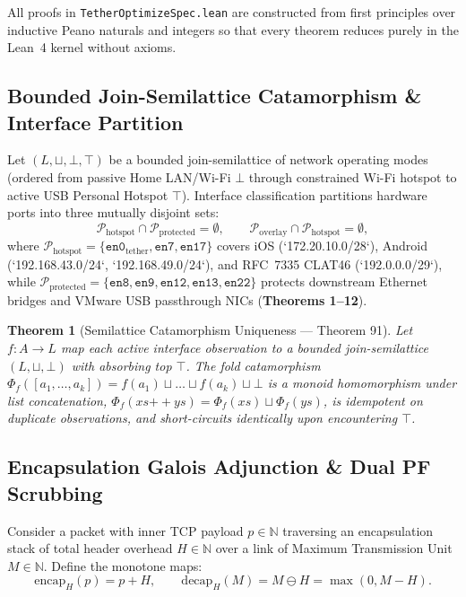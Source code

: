 \documentclass[11pt,a4paper]{article}
\newtheorem{theorem}{Theorem}[section]
\theoremstyle{definition}
\begin{document}
All proofs in \texttt{TetherOptimizeSpec.lean} are constructed from first principles over inductive Peano naturals and integers so that every theorem reduces purely in the Lean~4 kernel without axioms.

\subsection{Bounded Join-Semilattice Catamorphism \& Interface Partition}

Let $(L, \sqcup, \bot, \top)$ be a bounded join-semilattice of network operating modes (ordered from passive Home LAN/Wi-Fi $\bot$ through constrained Wi-Fi hotspot to active USB Personal Hotspot $\top$). Interface classification partitions hardware ports into three mutually disjoint sets:
\[
  \mathcal{P}_{\mathrm{hotspot}} \cap \mathcal{P}_{\mathrm{protected}} = \emptyset, \qquad
  \mathcal{P}_{\mathrm{overlay}} \cap \mathcal{P}_{\mathrm{hotspot}} = \emptyset,
\]
where $\mathcal{P}_{\mathrm{hotspot}} = \{\texttt{en0}_{\mathrm{tether}}, \texttt{en7}, \texttt{en17}\}$ covers iOS (`172.20.10.0/28`), Android (`192.168.43.0/24`, `192.168.49.0/24`), and RFC~7335 CLAT46 (`192.0.0.0/29`), while $\mathcal{P}_{\mathrm{protected}} = \{\texttt{en8}, \texttt{en9}, \texttt{en12}, \texttt{en13}, \texttt{en22}\}$ protects downstream Ethernet bridges and VMware USB passthrough NICs (\textbf{Theorems 1--12}).

\begin{theorem}[Semilattice Catamorphism Uniqueness --- Theorem 91]
Let $f : A \to L$ map each active interface observation to a bounded join-semilattice $(L, \sqcup, \bot)$ with absorbing top $\top$. The fold catamorphism $\Phi_f([a_1, \dots, a_k]) = f(a_1) \sqcup \dots \sqcup f(a_k) \sqcup \bot$ is a monoid homomorphism under list concatenation, $\Phi_f(xs \mathbin{+\!+} ys) = \Phi_f(xs) \sqcup \Phi_f(ys)$, is idempotent on duplicate observations, and short-circuits identically upon encountering $\top$.
\end{theorem}

\subsection{Encapsulation Galois Adjunction \& Dual PF Scrubbing}

Consider a packet with inner TCP payload $p \in \mathbb{N}$ traversing an encapsulation stack of total header overhead $H \in \mathbb{N}$ over a link of Maximum Transmission Unit $M \in \mathbb{N}$. Define the monotone maps:
\[
  \mathrm{encap}_H(p) = p + H, \qquad \mathrm{decap}_H(M) = M \ominus H = \max(0, M - H).
\]
\end{document}
